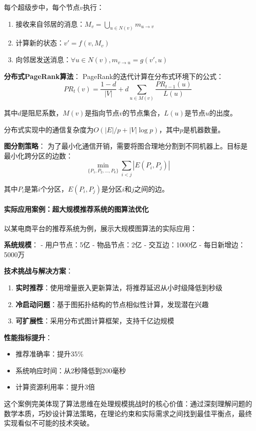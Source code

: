 每个超级步中，每个节点$v$执行：
\begin{enumerate}
\item 接收来自邻居的消息：$M_v = \bigcup_{u \in N(v)} m_{u\rightarrow v}$
\item 计算新的状态：$v' = f(v, M_v)$
\item 向邻居发送消息：$\forall u \in N(v), m_{v\rightarrow u} = g(v', u)$
\end{enumerate}

\textbf{分布式PageRank算法}：
PageRank的迭代计算在分布式环境下的公式：
$$PR_t(v) = \frac{1-d}{|V|} + d \sum_{u \in M(v)} \frac{PR_{t-1}(u)}{L(u)}$$

其中$d$是阻尼系数，$M(v)$是指向节点$v$的节点集合，$L(u)$是节点$u$的出度。

分布式实现中的通信复杂度为$O(|E|/p + |V|\log p)$，其中$p$是机器数量。

\textbf{图分割策略}：
为了最小化通信开销，需要将图合理地分割到不同机器上。目标是最小化跨分区的边数：
$$\min_{\{P_1, P_2, ..., P_k\}} \sum_{i < j} |E(P_i, P_j)|$$

其中$P_i$是第$i$个分区，$E(P_i, P_j)$是分区$i$和$j$之间的边。

\paragraph{实际应用案例：超大规模推荐系统的图算法优化}
以某电商平台的推荐系统为例，展示大规模图算法的实际应用：

\textbf{系统规模}：
- 用户节点：5亿
- 物品节点：2亿
- 交互边：1000亿
- 每日新增边：5000万

\textbf{技术挑战与解决方案}：
\begin{enumerate}
\item \textbf{实时推荐}：使用增量嵌入更新算法，将推荐延迟从小时级降低到秒级
\item \textbf{冷启动问题}：基于图拓扑结构的节点相似性计算，发现潜在兴趣
\item \textbf{可扩展性}：采用分布式图计算框架，支持千亿边规模
\end{enumerate}

\textbf{性能指标提升}：
\begin{itemize}
\item 推荐准确率：提升35\%
\item 系统响应时间：从2秒降低到200毫秒
\item 计算资源利用率：提升3倍
\end{itemize}

这个案例完美体现了算法思维在处理规模挑战时的核心价值：通过深刻理解问题的数学本质，巧妙设计算法策略，在理论约束和实际需求之间找到最佳平衡点，最终实现看似不可能的技术突破。

